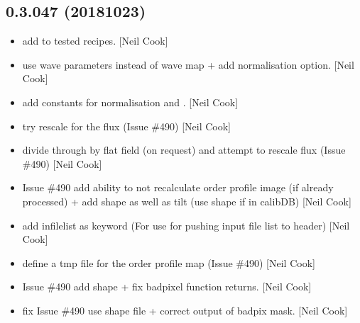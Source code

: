 \documentclass[a4paper,10pt,english]{report}
\begin{document}
\subsection{0.3.047 (2018\sphinxhyphen{}10\sphinxhyphen{}23)}
\label{\detokenize{misc/changelog:id303}}\begin{itemize}
\item {} 
 \sphinxhyphen{} add  to tested recipes. {[}Neil Cook{]}

\item {} 
 \sphinxhyphen{} use wave parameters instead of wave map +
add normalisation option. {[}Neil Cook{]}

\item {} 
 \sphinxhyphen{} add constants for normalisation and
. {[}Neil Cook{]}

\item {} 
 \sphinxhyphen{} try rescale for the flux (Issue \#490) {[}Neil
Cook{]}

\item {} 
 \sphinxhyphen{} divide through by flat field (on request) and
attempt to rescale flux (Issue \#490) {[}Neil Cook{]}

\item {} 
 \sphinxhyphen{} Issue \#490 \sphinxhyphen{} add ability to not re\sphinxhyphen{}calculate
order profile image (if already processed) + add shape as well as tilt
(use shape if in calibDB) {[}Neil Cook{]}

\item {} 
 \sphinxhyphen{} add infilelist as keyword (For use for pushing
input file list to header) {[}Neil Cook{]}

\item {} 
 \sphinxhyphen{} define a tmp file for the order profile map (Issue
\#490) {[}Neil Cook{]}

\item {} 
 \sphinxhyphen{} Issue \#490 \sphinxhyphen{} add shape + fix badpixel function
returns. {[}Neil Cook{]}

\item {} 
 \sphinxhyphen{} fix Issue \#490 \sphinxhyphen{} use shape file + correct
output of badpix mask. {[}Neil Cook{]}

\end{itemize}
\end{document}
